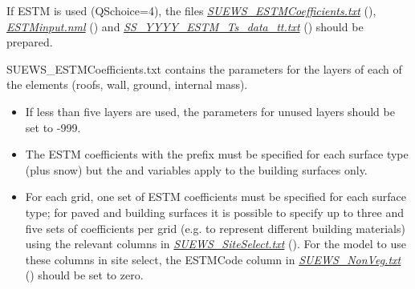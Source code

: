 \documentclass[letterpaper,10pt,english]{sphinxmanual}
\begin{document}
If ESTM is used (QSchoice=4), the files
{\hyperref[\detokenize{input_files/ESTM_input:SUEWS_ESTMCoefficients.txt}]{\emph{SUEWS\_ESTMCoefficients.txt}}} (),
{\hyperref[\detokenize{input_files/ESTM_input:ESTMinput.nml}]{\emph{ESTMinput.nml}}} () and
{\hyperref[\detokenize{input_files/ESTM_input:SS_YYYY_ESTM_Ts_data_tt.txt}]{\emph{SS\_YYYY\_ESTM\_Ts\_data\_tt.txt}}} () should be
prepared.

SUEWS\_ESTMCoefficients.txt contains the parameters for the layers of
each of the elements (roofs, wall, ground, internal mass).
\begin{itemize}
\item {} 
If less than five layers are used, the parameters for unused layers
should be set to -999.

\item {} 
The ESTM coefficients with the prefix  must be specified for
each surface type (plus snow) but the  and 
variables apply to the building surfaces only.

\item {} 
For each grid, one set of ESTM coefficients must be specified for
each surface type; for paved and building surfaces it is possible to
specify up to three and five sets of coefficients per grid (e.g. to
represent different building materials) using the relevant columns in
{\hyperref[\detokenize{input_files/ESTM_input:SUEWS_SiteSelect.txt}]{\emph{SUEWS\_SiteSelect.txt}}} (). For the model to
use these columns in site select, the ESTMCode column in
{\hyperref[\detokenize{input_files/ESTM_input:SUEWS_NonVeg.txt}]{\emph{SUEWS\_NonVeg.txt}}} () should be set to zero.

\end{itemize}
\end{document}
